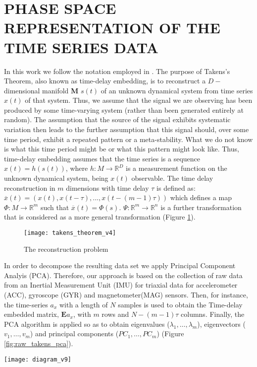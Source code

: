 \documentclass{sigchi}
\begin{document}
\section{PHASE SPACE REPRESENTATION OF THE TIME SERIES DATA}
In this work we follow the notation employed in \cite{Uzal2011}.
The purpose of Takens's Theorem, also known as time-delay embedding, 
is to reconstruct a $D-$dimensional manifold \textbf{M} $s(t)$ of an unknown dynamical 
system from time series $x(t)$ of that system.
Thus, we assume that the signal we are observing has been produced by some time-varying system 
(rather than been generated entirely at random).  
The assumption that the source of the signal exhibits systematic variation then leads to the further 
assumption that this signal should, over some time period, exhibit a repeated pattern or a meta-stability.  
What we do not know is what this time period might be or what this pattern might look like.  
Thus, time-delay embedding assumes that the time series is a sequence $x(t)=h(s(t))$, 
where $h: M \rightarrow \mathbb{R}^D$ is a measurement function on the unknown dynamical system, 
being $x(t)$ observable.
The time delay reconstruction in $m$ dimensions with time delay $\tau$ is defined as:
$\overline{x}(t) = (x(t), x(t-\tau),...,x(t-(m-1)\tau))$ which defines a map
$\varPhi: M \rightarrow \mathbb{R}^m$ such that $\overline{x}(t) = \varPhi(s)$.
$\varPsi: \mathbb{R}^m \rightarrow \mathbb{R}^n$ is a further transformation that
is considered as a more general transformation (Figure \ref{fig:takens_theorem}).
\begin{figure}[!htb]
\centering    
\texttt{[image: takens\_theorem\_v4]}
\caption[PA]{The reconstruction problem}
\label{fig:takens_theorem}
\end{figure}
In order to decompose the resulting data set we apply
Principal Component Analyis (PCA).
Therefore, our approach is based on the collection of raw data from an 
Inertial Measurement Unit (IMU) for triaxial data 
for accelerometer (ACC), gyroscope (GYR) and magnetometer(MAG) sensors. 
Then, for instance, the time-series $a_x$ with a length of 
$N$ samples is used to obtain the Time-delay embedded matrix, 
$\boldsymbol{E} a_{x}$, with $m$ rows and $N-(m-1)\tau$ columns. 
Finally, the PCA algorithm is applied so as to obtain eigenvalues 
($\lambda_1,\ldots,\lambda_m$), eigenvectors ($v_1,\ldots,v_m$) and principal components 
($PC_1,\ldots,PC_m$) (Figure \ref{fig:raw_takens_pca}).
\begin{figure*}[!ht]
\centering    
\texttt{[image: diagram\_v9]}
\caption[PA]{Diagram for the Phase Space Reconstruction.}
\label{fig:raw_takens_pca}
\end{figure*}
\end{document}
